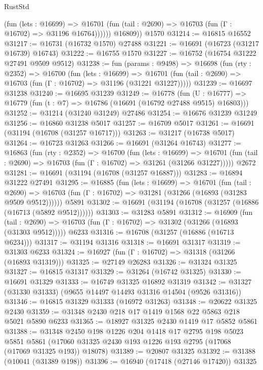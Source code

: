 \begin{lexlean}{RustStd}
\begin{coremodule}
              (fun (lets : @16699) =>
              @16701 (fun (tail : @2690) => @16703 (fun (Γ : @16702) => @31196 @16764))))))
        @16809))
    @1570
@31214 := @16815 @16552
@31217 := @16731 (@16732 @1570) @27488
@31221 := @16691 (@16723 (@31217 @16739) @16743)
@31222 := @16755 @1570
@31227 := @16752 (@16754 @31222 @27491 @9509 @9512)
@31238 := fun (params : @9498) =>
  @16698
    (fun (rty : @2352) =>
    @16700
      (fun (lets : @16699) =>
      @16701 (fun (tail : @2690) => @16703 (fun (Γ : @16702) => @31196 (@31221 @31227)))))
@31239 := @16697 @31238
@31240 := @16695 @31239
@31249 := @16778
    (fun (U : @16777) => @16779 (fun (t : @7) => @16786 (@16691 (@16792 @27488 @9515) @16803)))
@31252 := @31214 (@31240 @31249) @27486
@31254 := @16676 @31239 @31249
@31256 := @16860 @31238 @5017
@31257 := @16709 @5017
@31261 := @16691 (@31194 (@16708 (@31257 @16717)))
@31263 := @31217 (@16738 @5017)
@31264 := @16723 @31263
@31266 := @16691 (@31264 @16743)
@31277 := @16863
    (fun (rty : @2352) =>
    @16700
      (fun (lets : @16699) =>
      @16701 (fun (tail : @2690) => @16703 (fun (Γ : @16702) => @31261 (@31266 @31227)))))
    @2672
@31281 := @16691 (@31194 (@16708 (@31257 @16887)))
@31283 := @16894 @31222 @27491
@31295 := @16885
    (fun (lets : @16699) =>
    @16701
      (fun (tail : @2690) =>
      @16703 (fun (Γ : @16702) => @31281 (@31266 (@16893 (@31283 @9509 @9512))))))
    @5891
@31302 := @16691 (@31194 (@16708 (@31257 (@16886 (@16713 (@5892 @9512))))))
@31303 := @31283 @5891
@31312 := @16909
    (fun (tail : @2690) => @16703 (fun (Γ : @16702) => @31302 (@31266 (@16893 (@31303 @9512)))))
    @6233
@31316 := @16708 (@31257 (@16886 (@16713 @6234)))
@31317 := @31194 @31316
@31318 := @16691 @31317
@31319 := @31303 @6233
@31324 := @16927 (fun (Γ : @16702) => @31318 (@31266 (@16893 @31319)))
@31325 := @27149 @26283
@31326 := @31324 @31325
@31327 := @16815 @31317
@31329 := @31264 (@16742 @31325)
@31330 := @16691 @31329
@31333 := @16749 @31325 @16892 @31319
@31342 := @31327 (@31330 @31333) (@9655 @14497 @14493 @31316 @14504 (@9526 @31316))
@31346 := @16815 @31329 @31333 (@16972 @31263)
@31348 := @20622 @31325 @2430
@31359 := @31348 @2430 @218 @17 @1419 @1568 @22 @5863 @218 @5021 @5890 @6233
@31365 := @18927 @31325 @2430 @1419 @17 @5852 @5861
@31388 := @31348
    @2450
    @198
    @1226
    @204
    @1418
    @17
    @2795
    @198
    @5023
    @5851
    @5861
    (@17060 @31325 @2430 @193 @1226 @193 @2795 (@17068 (@17069 @31325 @193)) @18078)
@31389 := @20807 @31325
@31392 := @31388 (@10041 (@31389 @198))
@31396 := @16940 (@17418 (@27146 @17420)) @31325

\end{coremodule}
\end{lexlean}
